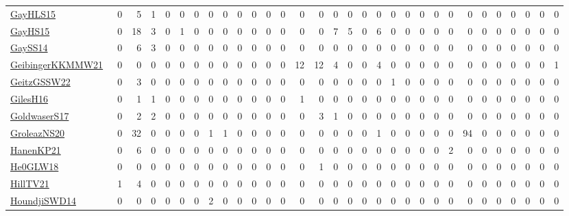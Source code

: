 \documentclass[a4paper]{article}
\begin{document}
{\begin{longtable}{l*{30}{r}}
\href{papers/GayHLS15.pdf}{GayHLS15}~\cite{GayHLS15} & 0 & 5 & 1 & 0 & 0 & 0 & 0 & 0 & 0 & 0 & 0 & 0 & 0 & 0 & 0 & 0 & 0 & 0 & 0 & 0 & 0 & 0 & 0 & 0 & 0 & 0 & 0 & 0 & 0 & 0\\
\href{papers/GayHS15.pdf}{GayHS15}~\cite{GayHS15} & 0 & 18 & 3 & 0 & 1 & 0 & 0 & 0 & 0 & 0 & 0 & 0 & 0 & 0 & 7 & 5 & 0 & 6 & 0 & 0 & 0 & 0 & 0 & 0 & 0 & 0 & 0 & 0 & 0 & 0\\
\href{papers/GaySS14.pdf}{GaySS14}~\cite{GaySS14} & 0 & 6 & 3 & 0 & 0 & 0 & 0 & 0 & 0 & 0 & 0 & 0 & 0 & 0 & 0 & 0 & 0 & 0 & 0 & 0 & 0 & 0 & 0 & 0 & 0 & 0 & 0 & 0 & 0 & 0\\
\href{papers/GeibingerKKMMW21.pdf}{GeibingerKKMMW21}~\cite{GeibingerKKMMW21} & 0 & 0 & 0 & 0 & 0 & 0 & 0 & 0 & 0 & 0 & 0 & 0 & 12 & 12 & 4 & 0 & 0 & 4 & 0 & 0 & 0 & 0 & 0 & 0 & 0 & 0 & 0 & 0 & 0 & 1\\
\href{papers/GeitzGSSW22.pdf}{GeitzGSSW22}~\cite{GeitzGSSW22} & 0 & 3 & 0 & 0 & 0 & 0 & 0 & 0 & 0 & 0 & 0 & 0 & 0 & 0 & 0 & 0 & 0 & 0 & 1 & 0 & 0 & 0 & 0 & 0 & 0 & 0 & 0 & 0 & 0 & 0\\
\href{papers/GilesH16.pdf}{GilesH16}~\cite{GilesH16} & 0 & 1 & 1 & 0 & 0 & 0 & 0 & 0 & 0 & 0 & 0 & 0 & 1 & 0 & 0 & 0 & 0 & 0 & 0 & 0 & 0 & 0 & 0 & 0 & 0 & 0 & 0 & 0 & 0 & 0\\
\href{papers/GoldwaserS17.pdf}{GoldwaserS17}~\cite{GoldwaserS17} & 0 & 2 & 2 & 0 & 0 & 0 & 0 & 0 & 0 & 0 & 0 & 0 & 0 & 3 & 1 & 0 & 0 & 0 & 0 & 0 & 0 & 0 & 0 & 0 & 0 & 0 & 0 & 0 & 0 & 0\\
\href{papers/GroleazNS20.pdf}{GroleazNS20}~\cite{GroleazNS20} & 0 & 32 & 0 & 0 & 0 & 0 & 1 & 1 & 0 & 0 & 0 & 0 & 0 & 0 & 0 & 0 & 0 & 1 & 0 & 0 & 0 & 0 & 0 & 94 & 0 & 0 & 0 & 0 & 0 & 0\\
\href{papers/HanenKP21.pdf}{HanenKP21}~\cite{HanenKP21} & 0 & 6 & 0 & 0 & 0 & 0 & 0 & 0 & 0 & 0 & 0 & 0 & 0 & 0 & 0 & 0 & 0 & 0 & 0 & 0 & 0 & 0 & 2 & 0 & 0 & 0 & 0 & 0 & 0 & 0\\
\href{papers/He0GLW18.pdf}{He0GLW18}~\cite{He0GLW18} & 0 & 0 & 0 & 0 & 0 & 0 & 0 & 0 & 0 & 0 & 0 & 0 & 0 & 1 & 0 & 0 & 0 & 0 & 0 & 0 & 0 & 0 & 0 & 0 & 0 & 0 & 0 & 0 & 0 & 0\\
\href{papers/HillTV21.pdf}{HillTV21}~\cite{HillTV21} & 1 & 4 & 0 & 0 & 0 & 0 & 0 & 0 & 0 & 0 & 0 & 0 & 0 & 0 & 0 & 0 & 0 & 0 & 0 & 0 & 0 & 0 & 0 & 0 & 0 & 0 & 0 & 0 & 0 & 0\\
\href{papers/HoundjiSWD14.pdf}{HoundjiSWD14}~\cite{HoundjiSWD14} & 0 & 0 & 0 & 0 & 0 & 0 & 2 & 0 & 0 & 0 & 0 & 0 & 0 & 0 & 0 & 0 & 0 & 0 & 0 & 0 & 0 & 0 & 0 & 0 & 0 & 0 & 0 & 0 & 0 & 0\\

\end{longtable}}
\end{document}
